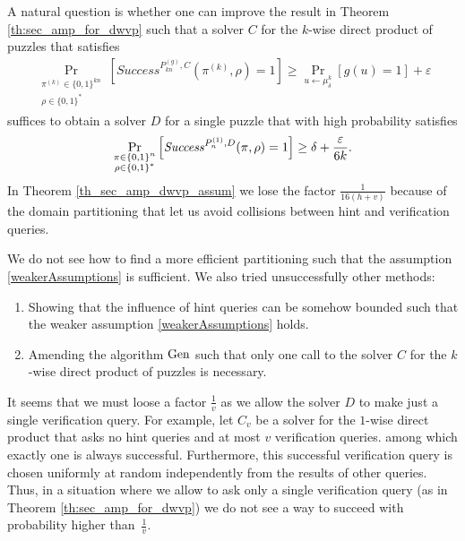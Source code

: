 A natural question is whether one can improve the result in Theorem \ref{th:sec_amp_for_dwvp} such that a solver $C$ for the $k$-wise direct product of puzzles that satisfies
\begin{align}
    \label{weakerAssumptions}
    \underset{\substack{\pi^{(k)} \in \{0,1\}^{kn} \\ \rho \in \{0,1\}^{*}}}{\Pr}\left[\mathit{Success}^{P_{kn}^{(g)}, C}(\pi^{(k)}, \rho) = 1\right]
    \geq \underset{u \leftarrow \mu_\delta^k}{\Pr}[g(u) = 1] + \varepsilon
\end{align}
suffices to obtain a solver $D$ for a single puzzle that with high probability satisfies
  \begin{align}
    \underset{\substack{\pi \in \{0,1\}^{n} \\ \rho \in \{0,1\}^{*}}}
    {\Pr}\left[\operatorname{\mathit{Success}}^{P_{n}^{(1)},D}(\pi, \rho) = 1\right] \geq \delta + \frac{\varepsilon}{6k}.
  \end{align}
In Theorem \ref{th_sec_amp_dwvp_assum} we lose the factor $\frac{1}{16(h+v)}$ because of the domain partitioning that let us avoid collisions between hint and verification queries.

We do not see how to find a more efficient partitioning such that the assumption \eqref{weakerAssumptions} is sufficient.
We also tried unsuccessfully other methods:
\begin{enumerate}[-]
  \item Showing that the influence of hint queries can be somehow bounded such that the weaker assumption \eqref{weakerAssumptions} holds. \\
  \item Amending the algorithm $\operatorname{\text{Gen}}$ such that only one call to the solver $C$ for the $k$-wise direct product of puzzles is necessary.
\end{enumerate}

It seems that we must loose a factor $\frac{1}{v}$ as we allow the solver $D$ to make just a single verification query.
For example, let $C_v$ be a solver for the $1$-wise direct product that asks no hint queries and at most $v$ verification queries.
among which exactly one is always successful.
Furthermore, this successful verification query is chosen uniformly at random independently from the results of other queries.
Thus, in a situation where we allow to ask only a single verification query (as in Theorem \ref{th:sec_amp_for_dwvp})
we do not see a way to succeed with probability higher than~$\frac{1}{v}$.

